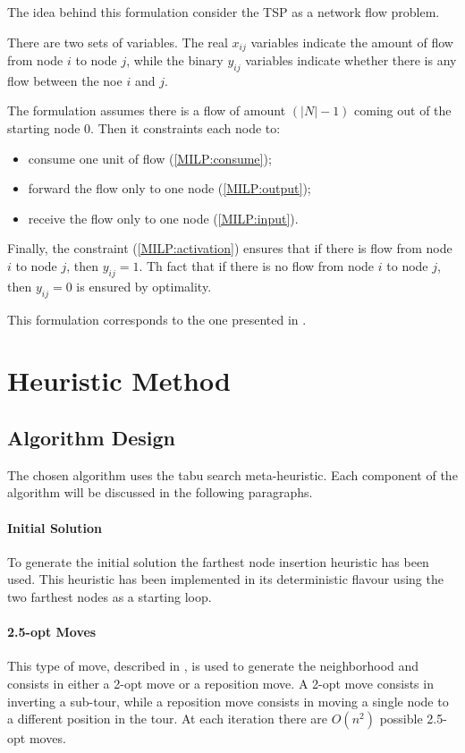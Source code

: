 \documentclass{article}
\begin{document}
The idea behind this formulation consider the TSP as a network flow problem.

There are two sets of variables.
The real $x_{i j}$ variables indicate the amount of flow from node $i$ to node $j$, while the binary $y_{i j}$ variables indicate whether there is any flow between the noe $i$ and $j$.

The formulation assumes there is a flow of amount $(|N|-1)$ coming out of the starting node $0$.
Then it constraints each node to:
\begin{itemize}
    \item consume one unit of flow (\ref{MILP:consume});
    \item forward the flow only to one node (\ref{MILP:output});
    \item receive the flow only to one node (\ref{MILP:input}).
\end{itemize}

Finally, the constraint (\ref{MILP:activation}) ensures that if there is flow from node $i$ to node $j$, then $y_{i j} = 1$.
Th fact that if there is no flow from node $i$ to node $j$, then $y_{i j} = 0$ is ensured by optimality.

This formulation corresponds to the one presented in \cite{gavish1978travelling}.

\section{Heuristic Method}
\label{sec:heuristic}

\subsection{Algorithm Design}
The chosen algorithm uses the tabu search meta-heuristic.
Each component of the algorithm will be discussed in the following paragraphs.

\paragraph{Initial Solution}
To generate the initial solution the farthest node insertion heuristic has been used.
This heuristic has been implemented in its deterministic flavour using the two farthest nodes as a starting loop.

\paragraph{2.5-opt Moves}
This type of move, described in \cite{johnson1997traveling}, is used to generate the neighborhood and consists in either a 2-opt move or a reposition move.
A 2-opt move consists in inverting a sub-tour, while a reposition move consists in moving a single node to a different position in the tour.
At each iteration there are $O(n^2)$ possible 2.5-opt moves.
\end{document}
